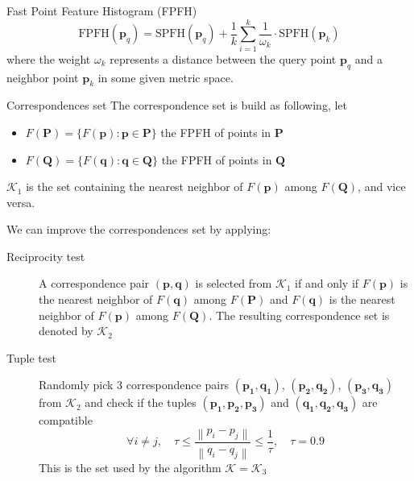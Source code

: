 \documentclass[aspectratio=1610]{beamer}
\newcommand{\norm}[1]{\left\lVert#1\right\rVert}
\begin{document}
\begin{frame}[allowframebreaks]{Fast Point Feature Histogram (FPFH)}
\begin{equation}
\label{eq:fpfh}
\text{FPFH}(\bm{p}_q)=\text{SPFH}(\bm{p}_q)+\frac{1}{k}\sum_{i=1}^{k}\frac{1}{\omega_k}\cdot\text{SPFH}(\bm{p}_k)
\end{equation}
where the weight $\omega_k$ represents a distance between the query point $\bm{p}_q$ and a neighbor point $\bm{p}_k$ in some given metric space.

\end{frame}

\begin{frame}[allowframebreaks]{Correspondences set}\label{fpfh_correspondences}
The correspondence set is build as following, let 
\begin{itemize}
\item $F(\bm{P})=\{F(\bm{p}):\bm{p}\in\bm{P}\}$ the FPFH of points in $\bm{P}$
\item $F(\bm{Q})=\{F(\bm{q}):\bm{q}\in\bm{Q}\}$ the FPFH of points in $\bm{Q}$
\end{itemize}

$\mathcal{K}_1$ is the set containing the nearest neighbor of $F(\bm{p})$ among $F(\bm{Q})$, and vice versa.

\framebreak

We can improve the correspondences set by applying:
\begin{description}
\item[Reciprocity test] A correspondence pair $(\bm{p}, \bm{q})$ is selected from $\mathcal{K}_1$ if and only if $F(\bm{p})$ is the nearest neighbor of $F(\bm{q})$ among $F(\bm{P})$ and $F(\bm{q})$ is the nearest neighbor of $F(\bm{p})$ among $F(\bm{Q})$. The resulting correspondence set is denoted by $\mathcal{K}_2$
\item[Tuple test] Randomly pick 3 correspondence pairs $(\bm{p_1}, \bm{q_1})$, $(\bm{p_2}, \bm{q_2})$, $(\bm{p_3}, \bm{q_3})$ from $\mathcal{K}_2$ and check if the tuples $(\bm{p_1}, \bm{p_2}, \bm{p_3})$ and $(\bm{q_1}, \bm{q_2}, \bm{q_3})$ are compatible
\[ \forall i\neq j, \quad \tau \le \frac{\norm{p_i-p_j}}{\norm{q_i-q_j}} \le \frac{1}{\tau}, \quad \tau=0.9 \]
This is the set used by the algorithm $\mathcal{K} = \mathcal{K}_3$
\end{description}
\end{frame}
\end{document}
